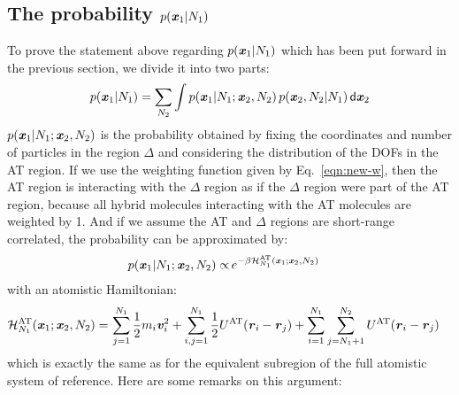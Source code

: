 \documentclass[aip,jcp,a4paper,reprint,onecolumn]{revtex4-1}
\newcommand{\redc}[1]{{\color{red} #1}}
\newcommand{\vect}[1]{\textbf{\textit{#1}}}
\newcommand{\dd}[1]{\textsf{#1}}
\newcommand{\AT}{{\textrm{{AT}}}}
\newcommand{\HY}{{\Delta}}
\begin{document}
\subsection{The probability $p(\vect x_1 | N_1)$}
\label{sec:p-1}
To prove the statement above regarding $p(\vect x_1 | N_1)$ which has been put forward in the previous section, we divide it into two parts:
\begin{align}\label{eqn:divide-cond-p}
  p(\vect x_1 | N_1) = \sum_{N_2}\int
  p(\vect x_1 | N_1; \vect x_2, N_2) \,
  p(\vect x_2, N_2 | N_1)
  \,\dd d\vect x_2
\end{align}
$p(\vect x_1 | N_1; \vect x_2, N_2)$ is the probability obtained by fixing the
coordinates and number of particles in the region $\HY$ and considering
the distribution of the DOFs in the AT region.
If we use the weighting function given by Eq.~\eqref{eqn:new-w},
then the AT region is interacting with the $\HY$ region
\redc{as if the $\HY$ region were part of the AT region, because
all hybrid molecules interacting with the AT molecules are weighted by 1.}
\redc{And} if we assume the AT and $\HY$ regions are short-range correlated,
the probability can be approximated by:
\begin{align}\label{eqn:p-1-1}
  p(\vect x_1 | N_1; \vect x_2, N_2)
  \propto &\,
  e^{-\beta\mathcal H_{N_1}^{\AT}(\vect x_1; \vect x_2, N_2)}
\end{align}
with an atomistic Hamiltonian:
\begin{align}\label{eqn:p-1-2}
  \mathcal H_{N_1}^{{\AT}}(\vect x_1; \vect x_2, N_2) = &\,
  \sum_{j=1}^{N_1}\frac12 m_i\vect v_i^2 + 
  \sum_{i,j=1}^{N_1}\frac12 U^{{\AT}}(\vect r_i - \vect r_j)  +
  \sum_{i=1}^{N_1}\sum_{j=N_1+1}^{N_2} U^{{\AT}}(\vect r_i - \vect r_j)   
\end{align}
which is exactly the same as for the equivalent subregion of the full atomistic system of reference.
Here are some remarks on this argument:
\end{document}
